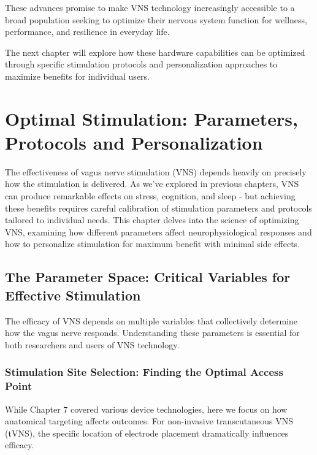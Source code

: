\documentclass[
  Letterpaper,
]{scrbook}
\begin{document}
These advances promise to make VNS technology increasingly accessible to
a broad population seeking to optimize their nervous system function for
wellness, performance, and resilience in everyday life.

The next chapter will explore how these hardware capabilities can be
optimized through specific stimulation protocols and personalization
approaches to maximize benefits for individual users.


\chapter{Optimal Stimulation: Parameters, Protocols and
Personalization}\label{optimal-stimulation-parameters-protocols-and-personalization}

The effectiveness of vagus nerve stimulation (VNS) depends heavily on
precisely how the stimulation is delivered. As we've explored in
previous chapters, VNS can produce remarkable effects on stress,
cognition, and sleep - but achieving these benefits requires careful
calibration of stimulation parameters and protocols tailored to
individual needs. This chapter delves into the science of optimizing
VNS, examining how different parameters affect neurophysiological
responses and how to personalize stimulation for maximum benefit with
minimal side effects.

\section{The Parameter Space: Critical Variables for Effective
Stimulation}\label{the-parameter-space-critical-variables-for-effective-stimulation}

The efficacy of VNS depends on multiple variables that collectively
determine how the vagus nerve responds. Understanding these parameters
is essential for both researchers and users of VNS technology.

\subsection{Stimulation Site Selection: Finding the Optimal Access
Point}\label{stimulation-site-selection-finding-the-optimal-access-point}

While Chapter 7 covered various device technologies, here we focus on
how anatomical targeting affects outcomes. For non-invasive
transcutaneous VNS (tVNS), the specific location of electrode placement
dramatically influences efficacy.
\end{document}
